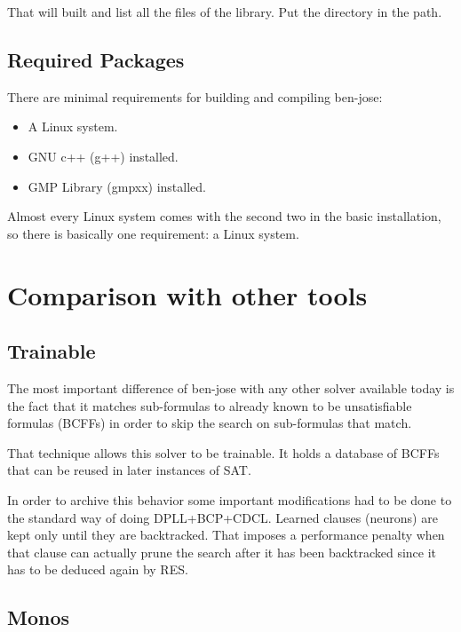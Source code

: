 \documentclass{easychair}
\newcommand{\neuron}{\textsf{neuron}}
\begin{document}
That will built and list all the files of the library. Put the directory in the path.

\subsection{Required Packages}

There are minimal requirements for building and compiling ben-jose:

\begin{itemize}
\item
A Linux system.

\item
GNU c++ (g++) installed.

\item
GMP Library (gmpxx) installed.
\end{itemize}

Almost every Linux system comes with the second two in the basic installation, so there is basically one requirement: a Linux system.

\section{Comparison with other tools}
\label{sect:comparison}

\subsection{Trainable}

The most important difference of ben-jose with any other solver available today is the fact that it matches sub-formulas to already known to be unsatisfiable formulas (BCFFs) in order to skip the search on sub-formulas that match.

That technique allows this solver to be trainable. It holds a database of BCFFs that can be reused in later instances of SAT.

In order to archive this behavior some important modifications had to be done to the standard way of doing DPLL+BCP+CDCL. Learned clauses ({\neuron}s) are kept only until they are backtracked. That imposes a performance penalty when that clause can actually prune the search after it has been backtracked since it has to be deduced again by RES.

\subsection{Monos}
\end{document}
